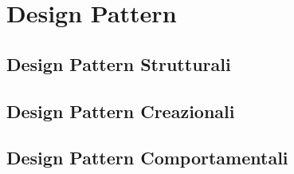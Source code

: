 \chapter{Design Pattern}

\section{Design Pattern Strutturali}

\section{Design Pattern Creazionali}

\section{Design Pattern Comportamentali}


